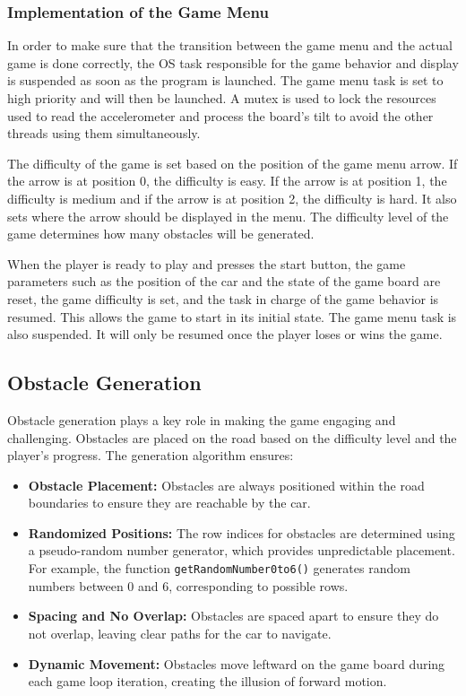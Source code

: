 \documentclass[conference]{IEEEtran}
\begin{document}
\subsubsection{Implementation of the Game Menu}
In order to make sure that the transition between the game menu and the actual game is done correctly, the OS task responsible for the game behavior and display is suspended as soon as the program is launched. The game menu task is set to high priority and will then be launched. A mutex is used to lock the resources used to read the accelerometer and process the board's tilt to avoid the other threads using them simultaneously. 

The difficulty of the game is set based on the position of the game menu arrow. If the arrow is at position 0, the difficulty is easy. If the arrow is at position 1, the difficulty is medium and if the arrow is at position 2, the difficulty is hard. It also sets where the arrow should be displayed in the menu. The difficulty level of the game determines how many obstacles will be generated.

When the player is ready to play and presses the start button, the game parameters such as the position of the car and the state of the game board are reset, the game difficulty is set, and the task in charge of the game behavior is resumed. This allows the game to start in its initial state. The game menu task is also suspended. It will only be resumed once the player loses or wins the game.

\subsection{Obstacle Generation}  
Obstacle generation plays a key role in making the game engaging and challenging. Obstacles are placed on the road based on the difficulty level and the player’s progress. The generation algorithm ensures:  
\begin{itemize}  
    \item \textbf{Obstacle Placement:} Obstacles are always positioned within the road boundaries to ensure they are reachable by the car.  
    \item \textbf{Randomized Positions:} The row indices for obstacles are determined using a pseudo-random number generator, which provides unpredictable placement. For example, the function \texttt{getRandomNumber0to6()} generates random numbers between 0 and 6, corresponding to possible rows.  
    \item \textbf{Spacing and No Overlap:} Obstacles are spaced apart to ensure they do not overlap, leaving clear paths for the car to navigate.  
    \item \textbf{Dynamic Movement:} Obstacles move leftward on the game board during each game loop iteration, creating the illusion of forward motion.  
\end{itemize}  
\end{document}
